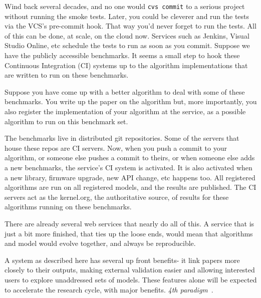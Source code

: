 \documentclass[conference]{IEEEtran}
\begin{document}
Wind back several decades, and no one would {\texttt{cvs commit}} to a
serious project without running the smoke tests. Later, you could be
cleverer and run the tests via the VCS's pre-commit hook. That way
you'd never forget to run the tests. All of this can be done, at
scale, on the cloud now. Services such as Jenkins, Visual Studio
Online, etc schedule the tests to run as soon as you commit. Suppose
we have the publicly accessible benchmarks. It seems a small step to
hook these Continuous Integration (CI) systems up to the algorithm
implementations that are written to run on these benchmarks.

Suppose you have come up with a better algorithm to deal with some of
these benchmarks. You write up the paper on the algorithm but, more
importantly, you also register the implementation of your algorithm at
the service, as a possible algorithm to run on this benchmark set.

The benchmarks live in distributed git repositories. Some of the
servers that house these repos are CI servers. Now, when you push a
commit to your algorithm, or someone else pushes a commit to theirs,
or when someone else adds a new benchmarks, the service's CI system is
activated. It is also activated when a new library, firmware upgrade,
new API change, etc happens too. All registered algorithms are run on
all registered models, and the results are published. The CI servers
act as the kernel.org, the authoritative source, of results for these
algorithms running on these benchmarks.

There are already several web services that nearly do all of this. A
service that is just a bit more finished, that ties up the loose ends,
would mean that algorithms and model would evolve together, and always
be reproducible.


A system as described here has several up front benefits- it link papers 
more closely to their outputs, making external validation easier and 
allowing interested users to explore unaddressed sets of models. These 
features alone will be expected to accelerate the research cycle, with
major benefits. \emph{4th paradigm}~\cite{hey:2009}.



\end{document}
